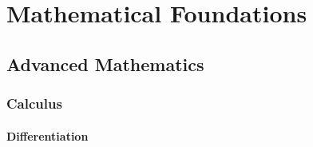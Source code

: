    \chapter{Mathematical Foundations}
    \section{Advanced Mathematics}
    \subsection{Calculus}
    \subsubsection{Differentiation}
